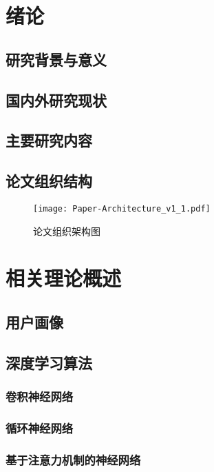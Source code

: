 \section{绪论}
\subsection{研究背景与意义}
\subsection{国内外研究现状}
\subsection{主要研究内容}
\subsection{论文组织结构}
\begin{figure}[hbt]
	\centering
	\texttt{[image: Paper-Architecture\_v1\_1.pdf]}
	\caption{论文组织架构图}
	\label{Fig:Paper_Architecture}
\end{figure}

\section{相关理论概述}
\subsection{用户画像}
\subsection{深度学习算法}
\subsubsection{卷积神经网络}
\subsubsection{循环神经网络}
\subsubsection{基于注意力机制的神经网络}
